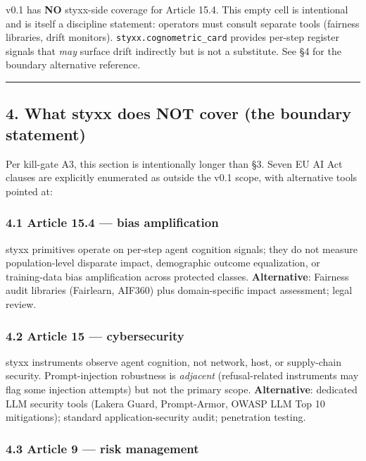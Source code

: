\documentclass[
]{article}
\begin{document}
v0.1 has \textbf{NO} styxx-side coverage for Article 15.4. This empty
cell is intentional and is itself a discipline statement: operators must
consult separate tools (fairness libraries, drift monitors).
\texttt{styxx.cognometric\_card} provides per-step register signals that
\emph{may} surface drift indirectly but is not a substitute. See §4 for
the boundary alternative reference.

\begin{center}\rule{0.5\linewidth}{0.5pt}\end{center}

\subsection{4. What styxx does NOT cover (the boundary
statement)}\label{what-styxx-does-not-cover-the-boundary-statement}

Per kill-gate A3, this section is intentionally longer than §3. Seven EU
AI Act clauses are explicitly enumerated as outside the v0.1 scope, with
alternative tools pointed at:

\subsubsection{4.1 Article 15.4 --- bias
amplification}\label{article-15.4-bias-amplification}

styxx primitives operate on per-step agent cognition signals; they do
not measure population-level disparate impact, demographic outcome
equalization, or training-data bias amplification across protected
classes. \textbf{Alternative}: Fairness audit libraries (Fairlearn,
AIF360) plus domain-specific impact assessment; legal review.

\subsubsection{4.2 Article 15 ---
cybersecurity}\label{article-15-cybersecurity}

styxx instruments observe agent cognition, not network, host, or
supply-chain security. Prompt-injection robustness is \emph{adjacent}
(refusal-related instruments may flag some injection attempts) but not
the primary scope. \textbf{Alternative}: dedicated LLM security tools
(Lakera Guard, Prompt-Armor, OWASP LLM Top 10 mitigations); standard
application-security audit; penetration testing.

\subsubsection{4.3 Article 9 --- risk
management}\label{article-9-risk-management}
\end{document}
